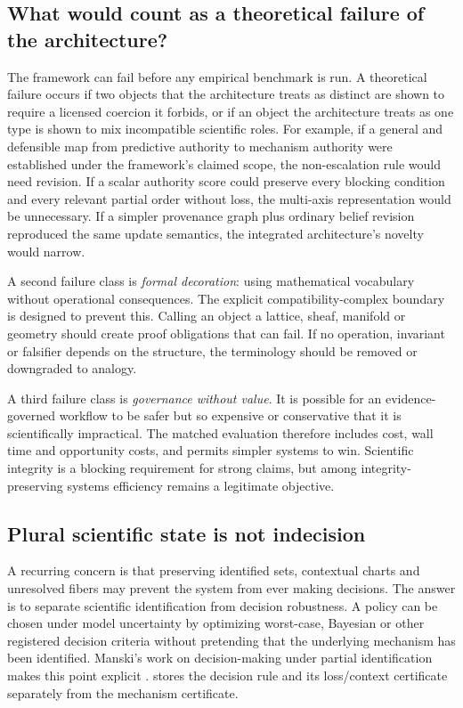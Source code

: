 \subsection{What would count as a theoretical failure of the architecture?}

The framework can fail before any empirical benchmark is run. A theoretical failure occurs if two objects that the architecture treats as distinct are shown to require a licensed coercion it forbids, or if an object the architecture treats as one type is shown to mix incompatible scientific roles. For example, if a general and defensible map from predictive authority to mechanism authority were established under the framework's claimed scope, the non-escalation rule would need revision. If a scalar authority score could preserve every blocking condition and every relevant partial order without loss, the multi-axis representation would be unnecessary. If a simpler provenance graph plus ordinary belief revision reproduced the same update semantics, the integrated architecture's novelty would narrow.

A second failure class is \emph{formal decoration}: using mathematical vocabulary without operational consequences. The explicit compatibility-complex boundary is designed to prevent this. Calling an object a lattice, sheaf, manifold or geometry should create proof obligations that can fail. If no operation, invariant or falsifier depends on the structure, the terminology should be removed or downgraded to analogy.

A third failure class is \emph{governance without value}. It is possible for an evidence-governed workflow to be safer but so expensive or conservative that it is scientifically impractical. The matched evaluation therefore includes cost, wall time and opportunity costs, and permits simpler systems to win. Scientific integrity is a blocking requirement for strong claims, but among integrity-preserving systems efficiency remains a legitimate objective.

\subsection{Plural scientific state is not indecision}

A recurring concern is that preserving identified sets, contextual charts and unresolved fibers may prevent the system from ever making decisions. The answer is to separate scientific identification from decision robustness. A policy can be chosen under model uncertainty by optimizing worst-case, Bayesian or other registered decision criteria without pretending that the underlying mechanism has been identified. Manski's work on decision-making under partial identification makes this point explicit \cite{manski2026underdetermination}. \RAKL{} stores the decision rule and its loss/context certificate separately from the mechanism certificate.

